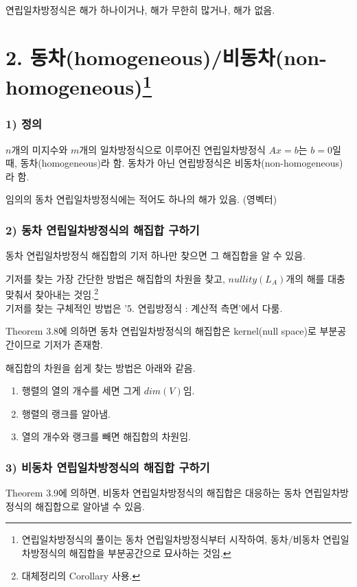 연립일차방정식은 해가 하나이거나, 해가 무한히 많거나, 해가 없음.


\newpage


\section*{2. 동차(homogeneous)/비동차(non-homogeneous)\footnote{연립일차방정식의 풀이는 동차 연립일차방정식부터 시작하여, 동차/비동차 연립일차방정식의 해집합을 부분공간으로 묘사하는 것임.}}
\subsubsection*{1) 정의\\}
\begin{DEF}
$n$개의 미지수와 $m$개의 일차방정식으로 이루어진 연립일차방정식 $Ax=b$는 $b=0$일 때, 동차(homogeneous)라 함. 동차가 아닌 연립방정식은 비동차(non-homogeneous)라 함.
\end{DEF}

임의의 동차 연립일차방정식에는 적어도 하나의 해가 있음. (영벡터)

\subsubsection*{2) 동차 연립일차방정식의 해집합 구하기}
동차 연립일차방정식 해집합의 기저 하나만 찾으면 그 해집합을 알 수 있음.

기저를 찾는 가장 간단한 방법은 해집합의 차원을 찾고, $nullity(L_A)$개의 해를 대충 맞춰서 찾아내는 것임.\footnote{대체정리의 Corollary 사용.}\\
기저를 찾는 구체적인 방법은 '5. 연립방정식 : 계산적 측면'에서 다룸.

Theorem 3.8에 의하면 동차 연립일차방정식의 해집합은 kernel(null space)로 부분공간이므로 기저가 존재함.

해집합의 차원을 쉽게 찾는 방법은 아래와 같음.
\begin{enumerate}
    \item 행렬의 열의 개수를 세면 그게 $dim(V)$임.
    \item 행렬의 랭크를 알아냄.
    \item 열의 개수와 랭크를 빼면 해집합의 차원임.
\end{enumerate}

\subsubsection*{3) 비동차 연립일차방정식의 해집합 구하기}
Theorem 3.9에 의하면, 비동차 연립일차방정식의 해집합은 대응하는 동차 연립일차방정식의 해집합으로 알아낼 수 있음.

